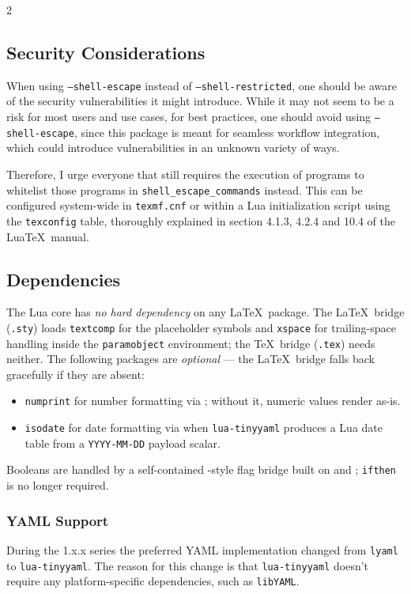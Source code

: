 \documentclass{ltxdoc}
\begin{document}
    \begin{multicols}{2}
        \subsection{Security Considerations}
        When using \texttt{--shell-escape} instead of \texttt{--shell-restricted}, one should be aware of the security vulnerabilities it might introduce.
        While it may not seem to be a risk for most users and use cases, for best practices, one should avoid using \texttt{--shell-escape}, since this package is meant for seamless workflow integration, which could introduce vulnerabilities in an unknown variety of ways.

        Therefore, I urge everyone that still requires the execution of programs to whitelist those programs in \texttt{shell\_escape\_commands} instead.
        This can be configured system-wide in \texttt{texmf.cnf} or within a Lua initialization script using the \texttt{texconfig} table, thoroughly explained in section 4.1.3, 4.2.4 and 10.4 of the Lua\TeX\ manual\cite{luatex}.

        \subsection{Dependencies}\label{sec:deps}
        The Lua core has \emph{no hard dependency} on any \LaTeX\ package.
        The \LaTeX\ bridge (\texttt{.sty}) loads \texttt{textcomp} for the placeholder symbols and \texttt{xspace} for trailing-space handling inside the \texttt{paramobject} environment; the \TeX\ bridge (\texttt{.tex}) needs neither.
        The following packages are \emph{optional} --- the \LaTeX\ bridge falls back gracefully if they are absent:
        \begin{itemize}[align=left,leftmargin=*]
            \item \texttt{numprint}\cite{numprint} for number formatting via \cmd{\paramnumberformat}; without it, numeric values render as-is.
            \item \texttt{isodate}\cite{isodate} for date formatting via \cmd{\paramdateformat} when \texttt{lua-tinyyaml} produces a Lua date table from a \texttt{YYYY-MM-DD} payload scalar.
        \end{itemize}
        Booleans are handled by a self-contained \cmd{\newif}-style flag bridge built on \cmd{\let} and \cmd{\csname}; \texttt{ifthen} is no longer required.

        \subsubsection{YAML Support}
        During the 1.x.x series the preferred YAML implementation changed from \texttt{lyaml}\cite{lyaml} to \texttt{lua-tinyyaml}\cite{lua-tinyyaml}.
        The reason for this change is that \texttt{lua-tinyyaml} doesn't require any platform-specific dependencies, such as \texttt{libYAML}\cite{libYAML}.


\end{multicols}
\end{document}
